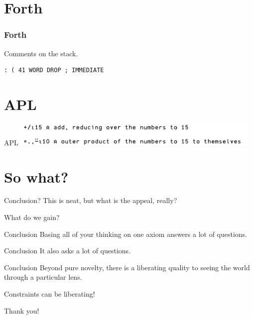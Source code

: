 \documentclass[aspectratio=169,14pt]{beamer}
\begin{document}
  \section{Forth}
  \begin{frame}[fragile]
    \frametitle{Forth}
    \begin{listing}[H]
      \caption{Comments on the stack.}
      \begin{verbatim}
: ( 41 WORD DROP ; IMMEDIATE
      \end{verbatim}
    \end{listing}
  \end{frame}
  \section{APL}
  \begin{frame}{APL}
    \includegraphics[width=12cm]{apl}
  \end{frame}
  \section{So what?}
  \begin{frame}{Conclusion?}
    This is neat, but what is the appeal, really?

\bigskip
    What do we gain?
  \end{frame}
  \begin{frame}{Conclusion}
    Basing all of your thinking on one axiom answers a lot of questions.
  \end{frame}
  \begin{frame}{Conclusion}
    It also asks a lot of questions.
  \end{frame}
  \begin{frame}{Conclusion}
    Beyond pure novelty, there is a liberating quality to seeing the world
    through a particular lens.

\bigskip
    Constraints can be liberating!
  \end{frame}
  \begin{frame}{}
    Thank you!
  \end{frame}
\end{document}
